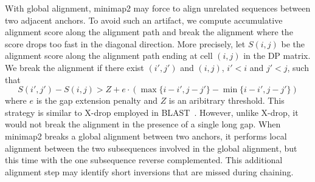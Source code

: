 \documentclass{bioinfo}
\begin{document}
\begin{methods}
With global alignment, minimap2 may force to align unrelated sequences between
two adjacent anchors. To avoid such an artifact, we compute accumulative
alignment score along the alignment path and break the alignment where the
score drops too fast in the diagonal direction. More precisely, let $S(i,j)$ be
the alignment score along the alignment path ending at cell $(i,j)$ in the DP
matrix. We break the alignment if there exist $(i',j')$ and $(i,j)$, $i'<i$ and
$j'<j$, such that
\[
S(i',j')-S(i,j)>Z+e\cdot(\max\{i-i',j-j'\}-\min\{i-i',j-j'\})
\]
where $e$ is the gap extension penalty and $Z$ is an aribitrary threshold.
This strategy is similar to X-drop employed in BLAST~\citep{Altschul:1997vn}.
However, unlike X-drop, it would not break the alignment in the presence of a
single long gap. When minimap2 breaks a global alignment between two anchors,
it performs local alignment between the two subsequences involved in the global
alignment, but this time with the one subsequence reverse complemented. This
additional alignment step may identify short inversions that are missed during
chaining.


\end{methods}
\end{document}
